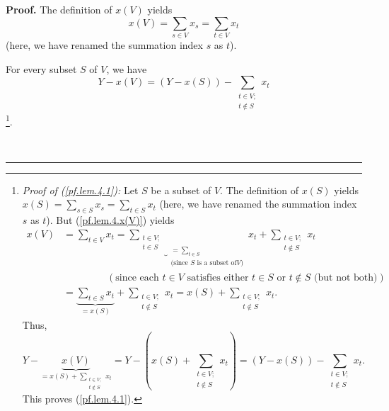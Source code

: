 \documentclass[numbers=enddot,12pt,final,onecolumn,notitlepage]{scrartcl}%
\theoremstyle{definition}
\newenvironment{proof}[1][Proof]{\noindent\textbf{#1.} }{\ \rule{0.5em}{0.5em}}
\let\sumnonlimits\sum
\renewcommand{\sum}{\sumnonlimits\limits}
\newenvironment{verlong}{}{}
\begin{document}
\begin{verlong}
\begin{proof}
The definition of $x\left(  V\right)  $ yields%
\begin{equation}
x\left(  V\right)  =\sum_{s\in V}x_{s}=\sum_{t\in V}x_{t}
\label{pf.lem.4.x(V)}%
\end{equation}
(here, we have renamed the summation index $s$ as $t$).

For every subset $S$ of $V$, we have
\begin{equation}
Y-x\left(  V\right)  =\left(  Y-x\left(  S\right)  \right)  -\sum
_{\substack{t\in V;\\t\notin S}}x_{t} \label{pf.lem.4.1}%
\end{equation}
\footnote{\textit{Proof of (\ref{pf.lem.4.1}):} Let $S$ be a subset of $V$.
The definition of $x\left(  S\right)  $ yields $x\left(  S\right)  =\sum_{s\in
S}x_{s}=\sum_{t\in S}x_{t}$ (here, we have renamed the summation index $s$ as
$t$). But (\ref{pf.lem.4.x(V)}) yields%
\begin{align*}
x\left(  V\right)   &  =\sum_{t\in V}x_{t}=\underbrace{\sum_{\substack{t\in
V;\\t\in S}}}_{\substack{=\sum_{t\in S}\\\text{(since }S\text{ is a subset of
}V\text{)}}}x_{t}+\sum_{\substack{t\in V;\\t\notin S}}x_{t}\\
&  \ \ \ \ \ \ \ \ \ \ \ \ \ \ \ \ \ \ \ \ \left(  \text{since each }t\in
V\text{ satisfies either }t\in S\text{ or }t\notin S\text{ (but not
both)}\right) \\
&  =\underbrace{\sum_{t\in S}x_{t}}_{=x\left(  S\right)  }+\sum
_{\substack{t\in V;\\t\notin S}}x_{t}=x\left(  S\right)  +\sum_{\substack{t\in
V;\\t\notin S}}x_{t}.
\end{align*}
Thus,%
\[
Y-\underbrace{x\left(  V\right)  }_{=x\left(  S\right)  +\sum_{\substack{t\in
V;\\t\notin S}}x_{t}}=Y-\left(  x\left(  S\right)  +\sum_{\substack{t\in
V;\\t\notin S}}x_{t}\right)  =\left(  Y-x\left(  S\right)  \right)
-\sum_{\substack{t\in V;\\t\notin S}}x_{t}.
\]
This proves (\ref{pf.lem.4.1}).}.


\end{proof}
\end{verlong}
\end{document}
